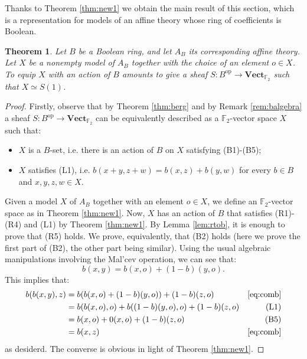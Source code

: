\documentclass{amsart}
\numberwithin{equation}{section}
\theoremstyle{plain}
\newtheorem{theorem}{Theorem}[section]
\theoremstyle{definition}
\DeclareMathOperator{\op}{op}
\begin{document}
Thanks to Theorem \ref{thm:new1} we obtain the main result of this section, which is a representation for models of an affine theory whose ring of coefficients is Boolean. 
\begin{theorem}
  \label{thm:new2}
    Let $B$ be a Boolean ring, and let $A_B$ its corresponding affine theory. 
    Let $X$ be a nonempty model of $A_B$ together with the choice of an element $o \in X$. 
    To equip $X$ with an action of $B$ amounts to give a sheaf $S:B^{\op} \to \mathbf{Vect}_{\mathbb{F}_2}$ such that $X \simeq S(1)$.
\end{theorem}
\begin{proof}
  Firstly, observe that by Theorem \ref{thm:berg} and by Remark \ref{rem:balgebra} a sheaf $S:B^{\op} \to \mathbf{Vect}_{\mathbb{F}_2}$ can be equivalently described as a $\mathbb{F}_2$-vector space $X$ such that: 
  \begin{itemize}
    \item $X$ is a $B$-set, i.e. there is an action of $B$ on $X$ satisfying (B1)-(B5); 
    \item $X$ satisfies (L1), i.e. $b(x+y,z+w) = b(x,z)+b(y,w)$ for every $b \in B$ and $x,y,z,w \in X$. 
  \end{itemize}
  Given a model $X$ of $A_B$ together with an element $o \in X$, we define an $\mathbb{F}_2$-vector space as in Theorem \ref{thm:new1}. 
  Now, $X$ has an action of $B$ that satisfies (R1)-(R4) and (L1) by Theorem \ref{thm:new1}.  
  By Lemma \ref{lem:rtob}, it is enough to prove that (R5) holds. 
  We prove, equivalently, that (B2) holds (here we prove the first part of (B2), the other part being similar).
  Using the usual algebraic manipulations involving the Mal'cev operation, we can see that:  
  \begin{equation}
    \label{eq:comb}
    b(x,y)=b(x,o)+(1-b)(y,o)\text{.}
  \end{equation}
  This implies that:
  \begin{align*}
    b(b(x,y),z) & = b(b(x,o)+(1-b)(y,o)) +(1-b)(z,o) & \eqref{eq:comb} \\
    & = b(b(x,o),o)+b((1-b)(y,o),o)+(1-b)(z,o) & \text{(L1)} \\
    & = b(x,o)+0(x,o)+(1-b)(z,o) & \text{(B5)} \\
    & = b(x,z) & \eqref{eq:comb}
  \end{align*} 
  as desiderd. 
  The converse is obvious in light of Theorem \ref{thm:new1}. 
\end{proof}
\end{document}
